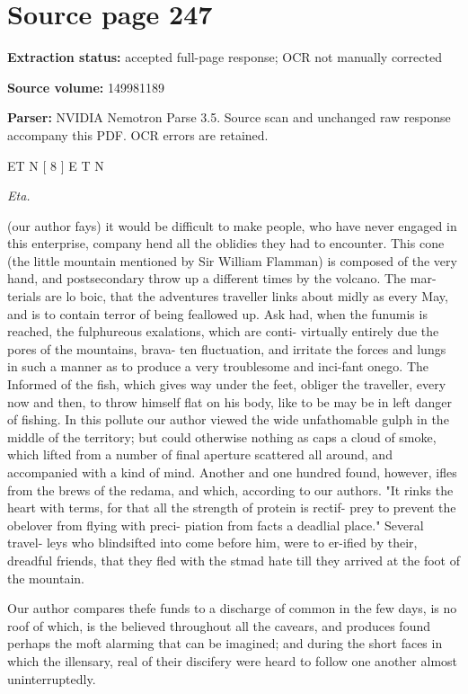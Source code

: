 \clearpage
\section{Source page 247}
\textbf{Extraction status:} accepted full-page response; OCR not manually corrected\par
\textbf{Source volume:} 149981189\par
\textbf{Parser:} NVIDIA Nemotron Parse 3.5. Source scan and unchanged raw response accompany this PDF. OCR errors are retained.\par\medskip
ET N [ 8 ] E T N\par\medskip
{\small\itshape Eta.\par}\medskip
(our author fays) it would be difficult to make people, who have never engaged in this enterprise, company hend all the oblidies they had to encounter. This cone (the little mountain mentioned by Sir William Flamman) is composed of the very hand, and postsecondary throw up a different times by the volcano. The mar- terials are lo boic, that the adventures traveller links about midly as every May, and is to contain terror of being feallowed up. Ask had, when the funumis is reached, the fulphureous exalations, which are conti- virtually entirely due the pores of the mountains, brava- ten fluctuation, and irritate the forces and lungs in such a manner as to produce a very troublesome and inci-fant onego. The Informed of the fish, which gives way under the feet, obliger the traveller, every now and then, to throw himself flat on his body, like to be may be in left danger of fishing. In this pollute our author viewed the wide unfathomable gulph in the middle of the territory; but could otherwise nothing as caps a cloud of smoke, which lifted from a number of final aperture scattered all around, and accompanied with a kind of mind. Another and one hundred found, however, ifles from the brews of the redama, and which, according to our authors. "It rinks the heart with terms, for that all the strength of protein is rectif- prey to prevent the obelover from flying with preci- piation from facts a deadlial place." Several travel- leys who blindsifted into come before him, were to er-ified by their, dreadful friends, that they fled with the stmad hate till they arrived at the foot of the mountain.\par\medskip
Our author compares thefe funds to a discharge of common in the few days, is no roof of which, is the believed throughout all the cavears, and produces found perhaps the moft alarming that can be imagined; and during the short faces in which the illensary, real of their discifery were heard to follow one another almost uninterruptedly.\par\medskip
